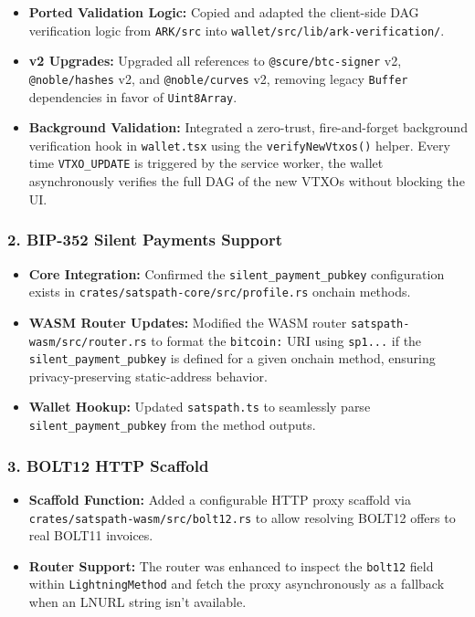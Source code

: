 \documentclass[
]{article}
\providecommand{\tightlist}{%
  \setlength{\itemsep}{0pt}\setlength{\parskip}{0pt}}
\begin{document}
\begin{itemize}
\tightlist
\item
  \textbf{Ported Validation Logic:} Copied and adapted the client-side
  DAG verification logic from \texttt{ARK/src} into
  \texttt{wallet/src/lib/ark-verification/}.
\item
  \textbf{v2 Upgrades:} Upgraded all references to
  \texttt{@scure/btc-signer} v2, \texttt{@noble/hashes} v2, and
  \texttt{@noble/curves} v2, removing legacy \texttt{Buffer}
  dependencies in favor of \texttt{Uint8Array}.
\item
  \textbf{Background Validation:} Integrated a zero-trust,
  fire-and-forget background verification hook in \texttt{wallet.tsx}
  using the \texttt{verifyNewVtxos()} helper. Every time
  \texttt{VTXO\_UPDATE} is triggered by the service worker, the wallet
  asynchronously verifies the full DAG of the new VTXOs without blocking
  the UI.
\end{itemize}

\hypertarget{bip-352-silent-payments-support}{%
\subsubsection{2. BIP-352 Silent Payments
Support}\label{bip-352-silent-payments-support}}

\begin{itemize}
\tightlist
\item
  \textbf{Core Integration:} Confirmed the
  \texttt{silent\_payment\_pubkey} configuration exists in
  \texttt{crates/satspath-core/src/profile.rs} onchain methods.
\item
  \textbf{WASM Router Updates:} Modified the WASM router
  \texttt{satspath-wasm/src/router.rs} to format the \texttt{bitcoin:}
  URI using \texttt{sp1...} if the \texttt{silent\_payment\_pubkey} is
  defined for a given onchain method, ensuring privacy-preserving
  static-address behavior.
\item
  \textbf{Wallet Hookup:} Updated \texttt{satspath.ts} to seamlessly
  parse \texttt{silent\_payment\_pubkey} from the method outputs.
\end{itemize}

\hypertarget{bolt12-http-scaffold}{%
\subsubsection{3. BOLT12 HTTP Scaffold}\label{bolt12-http-scaffold}}

\begin{itemize}
\tightlist
\item
  \textbf{Scaffold Function:} Added a configurable HTTP proxy scaffold
  via \texttt{crates/satspath-wasm/src/bolt12.rs} to allow resolving
  BOLT12 offers to real BOLT11 invoices.
\item
  \textbf{Router Support:} The router was enhanced to inspect the
  \texttt{bolt12} field within \texttt{LightningMethod} and fetch the
  proxy asynchronously as a fallback when an LNURL string isn't
  available.
\end{itemize}
\end{document}

